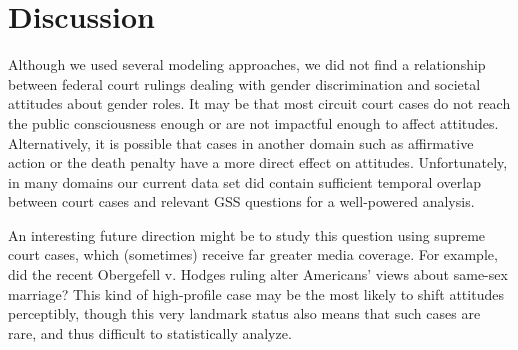 \documentclass{article}
\begin{document}
\section{Discussion}\label{discussion}

Although we used several modeling approaches, we did not find a
relationship between federal court rulings dealing with gender
discrimination and societal attitudes about gender roles. It may be that
most circuit court cases do not reach the public consciousness enough or
are not impactful enough to affect attitudes. Alternatively, it is
possible that cases in another domain such as affirmative action or the
death penalty have a more direct effect on attitudes. Unfortunately, in
many domains our current data set did contain sufficient temporal
overlap between court cases and relevant GSS questions for a
well-powered analysis.

An interesting future direction might be to study this question using
supreme court cases, which (sometimes) receive far greater media
coverage. For example, did the recent Obergefell v. Hodges ruling alter
Americans' views about same-sex marriage? This kind of high-profile case
may be the most likely to shift attitudes perceptibly, though this very
landmark status also means that such cases are rare, and thus difficult
to statistically analyze.


\end{document}
